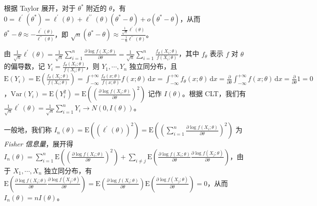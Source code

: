 \documentclass[../main.tex]{subfiles}
\begin{document}
根据 Taylor 展开，对于 $\theta^*$ 附近的 $\theta$，有 $0=\ell^\prime(\theta^*)=\ell^\prime(\theta)+\ell^{\prime\prime}(\theta)(\theta^*-\theta)+o(\theta^*-\theta)$，从而 $\theta^*-\theta\approx-\frac{\ell^\prime(\theta)}{\ell^{\prime\prime}(\theta)}$，即 $\sqrt n(\theta^*-\theta)\approx\frac{\frac1{\sqrt n}\ell^\prime(\theta)}{-\frac1n\ell^{\prime\prime}(\theta)}$。

由 $\frac1{\sqrt n}\ell^\prime(\theta)=\frac1{\sqrt n}\sum_{i=1}^n\frac{\partial\log f(X_i;\theta)}{\partial\theta}=\frac1{\sqrt n}\sum_{i=1}^n\frac{f_\theta(X_i;\theta)}{f(X_i;\theta)}$，其中 $f_\theta$ 表示 $f$ 对 $\theta$ 的偏导数，记 $Y_i=\frac{f_\theta(X_i;\theta)}{f(X_i;\theta)}$，则 $Y_1,\cdots,Y_n$ 独立同分布，且 $\mathrm E(Y_i)=\mathrm E\left(\frac{f_\theta(X_i;\theta)}{f(X_i;\theta)}\right)=\int_{-\infty}^{+\infty}\frac{f_\theta(x;\theta)}{f(x;\theta)}f(x;\theta)\,\mathrm dx=\int_{-\infty}^{+\infty}f_\theta(x;\theta)\,\mathrm dx=\frac{\partial}{\partial\theta}\int_{-\infty}^{+\infty}f(x;\theta)\,\mathrm dx=\frac{\partial}{\partial\theta}1=0$，$\mathrm{Var}(Y_i)=\mathrm E(Y_i^2)=\mathrm E\left(\left(\frac{\partial\log f(X_i;\theta)}{\partial\theta}\right)^2\right)$ 记作 $I(\theta)$。根据 CLT，我们有 $\frac1{\sqrt n}\ell^\prime(\theta)=\frac1{\sqrt n}\sum_{i=1}^nY_i\rightarrow N(0,I(\theta))$。

一般地，我们称 $I_n(\theta)=\mathrm E((\ell^\prime(\theta))^2)=\mathrm E\left(\left(\sum_{i=1}^n\frac{\partial\log f(X_i;\theta)}{\partial\theta}\right)^2\right)$ 为\emph{Fisher 信息量}，展开得 $I_n(\theta)=\sum_{i=1}^n\mathrm E\left(\left(\frac{\partial\log f(X_i;\theta)}{\partial\theta}\right)^2\right)+\sum_{i\neq j}\mathrm E\left(\frac{\partial\log f(X_i;\theta)}{\partial\theta}\frac{\partial\log f(X_j;\theta)}{\partial\theta}\right)$，由于 $X_1,\cdots,X_n$ 独立同分布，有 $\mathrm E\left(\frac{\partial\log f(X_i;\theta)}{\partial\theta}\frac{\partial\log f(X_j;\theta)}{\partial\theta}\right)=\mathrm E\left(\frac{\partial\log f(X_i;\theta)}{\partial\theta}\right)\mathrm E\left(\frac{\partial\log f(X_j;\theta)}{\partial\theta}\right)=0$，从而 $I_n(\theta)=nI(\theta)$。
\end{document}
